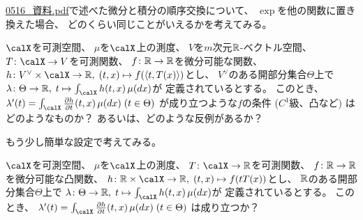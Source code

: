 \documentclass[report]{jlreq}
\begin{document}
%

\url{0516_資料.pdf}で述べた微分と積分の順序交換について、
$\exp$を他の関数に置き換えた場合、
どのくらい同じことがいえるかを考えてみる。

\begin{problem}
    $\calX$を可測空間、
    $\mu$を$\calX$上の測度、
    $V$を$m$次元$\mathbb{R}$-ベクトル空間、
    $T \colon \calX \to V$を可測関数、
    $f \colon \mathbb{R} \to \mathbb{R}$を微分可能な関数、
    $h \colon V^\vee \times \calX \to \R, \; (t, x) \mapsto f(\myangle{t}{T(x)})$とし、
    $V^\vee$のある開部分集合$\Theta$上で
    $\lambda \colon \Theta \to \R, \; t \mapsto \int_\calX h(t, x) \, \mu(dx)$が
    定義されているとする。
    このとき、
    $\lambda'(t) = \int_\calX \deldel[h]{t} (t, x) \, \mu(dx) \; (t \in \Theta)$
    が成り立つような$f$の条件 ($C^1$級、凸など) はどのようなものか？
    あるいは、どのような反例があるか？
\end{problem}

もう少し簡単な設定で考えてみる。

\begin{problem}
    $\calX$を可測空間、
    $\mu$を$\calX$上の測度、
    $T \colon \calX \to \R$を可測関数、
    $f \colon \mathbb{R} \to \mathbb{R}$を微分可能な凸関数、
    $h \colon \R \times \calX \to \R, \; (t, x) \mapsto f(tT(x))$とし、
    $\mathbb{R}$のある開部分集合$\Theta$上で
    $\lambda \colon \Theta \to \R, \; t \mapsto \int_\calX h(t, x) \, \mu(dx)$が
    定義されているとする。
    このとき、
    $\lambda'(t) = \int_\calX \deldel[h]{t} (t, x) \, \mu(dx) \; (t \in \Theta)$
    は成り立つか？
\end{problem}
\end{document}
